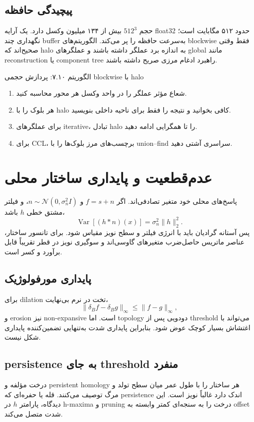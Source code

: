 \documentclass[12pt,openany,oneside]{book}
\begin{document}
\subsection{پیچیدگی حافظه}
حجم \(512^3\) بیش از ۱۳۴ میلیون وکسل دارد. یک آرایه float32 حدود ۵۱۲ مگابایت است؛ نگهداری چند buffer به‌سرعت
حافظه را پر می‌کند. الگوریتم‌های blockwise فقط وقتی صحیح‌اند که halo به اندازه برد عملگر داشته باشند و
عملگرهای global مانند reconstruction یا component tree راهبرد ادغام مرزی صریح داشته باشند.

\begin{algorithmbox}{الگوریتم ۷.۱۰: پردازش حجمی blockwise با halo}
\begin{enumerate}
\item شعاع مؤثر عملگر را در واحد وکسل هر محور محاسبه کنید.
\item هر بلوک را با halo کافی بخوانید و نتیجه را فقط برای ناحیه داخلی بنویسید.
\item برای عملگرهای iterative، تبادل halo را تا همگرایی ادامه دهید.
\item برای CCL، برچسب‌های مرز بلوک‌ها را با union--find سراسری آشتی دهید.
\end{enumerate}
\end{algorithmbox}

\section{عدم‌قطعیت و پایداری ساختار محلی}
پاسخ‌های محلی خود متغیر تصادفی‌اند. اگر \(f=s+n\) و \(n\sim\mathcal N(0,\sigma_n^2I)\)، و فیلتر مشتق خطی
\(h\) باشد،
\begin{equation}
\operatorname{Var}[(h*n)(x)]=\sigma_n^2\|h\|_2^2.
\end{equation}
پس آستانه گرادیان باید با انرژی فیلتر و سطح نویز مقیاس شود. برای تانسور ساختار، عناصر ماتریس حاصل‌ضرب متغیرهای
گاوسی‌اند و سوگیری نویز در قطر تقریباً قابل برآورد و کسر است.

\subsection{پایداری مورفولوژیک}
برای dilation تخت در نرم بی‌نهایت،
\begin{equation}
\|\delta_B f-\delta_B g\|_\infty\le\|f-g\|_\infty,
\end{equation}
و erosion نیز non-expansive است. اما topology دودویی پس از threshold می‌تواند با اغتشاش بسیار کوچک عوض شود.
بنابراین پایداری شدت به‌تنهایی تضمین‌کننده پایداری شکل نیست.

\subsection{persistence به جای threshold منفرد}
درخت مؤلفه و persistent homology هر ساختار را با طول عمر میان سطح تولد و مرگ توصیف می‌کنند. قله یا حفره‌ای
که persistence اندک دارد غالباً نویز است. این دیدگاه، پارامتر \(h\) در h-maxima و pruning درخت را به سنجه‌ای
کمتر وابسته به offset شدت متصل می‌کند.
\end{document}
